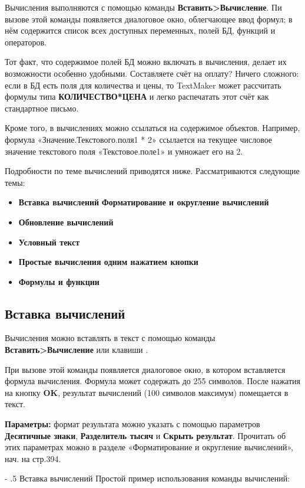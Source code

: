 ﻿\documentclass[a4paper,10pt]{article}
\makeatletter
\renewcommand\paragraph{%
   \@startsection{paragraph}{4}{0mm}%
      {-\baselineskip}%
      {.5\baselineskip}%
      {\normalfont\normalsize\bfseries}}
\makeatother
\begin{document}
Вычисления выполняются с помощью команды \textbf{Вставить>Вычисление}. Пи вызове этой команды появляется диалоговое окно, облегчающее ввод формул; в нём содержится список всех доступных переменных, полей БД, функций и операторов.

Тот факт, что содержимое полей БД можно включать в вычисления, делает их возможности особенно удобными. Составляете счёт на оплату? Ничего сложного: если в БД есть поля для количества и цены, то TextMaker может рассчитать формулы типа \textbf{КОЛИЧЕСТВО*ЦЕНА} и легко распечатать этот счёт как стандартное письмо.

Кроме того, в вычислениях можно ссылаться на содержимое объектов. Например, формула «Значение.Текстового.поля1 * 2» ссылается на текущее числовое значение текстового поля «Текстовое.поле1» и умножает его на 2.

Подробности по теме вычислений приводятся ниже. Рассматриваются следующие темы:

\begin{itemize}
 \item \textbf{Вставка вычислений}
 \textbf{Форматирование и округление вычислений}
 \item \textbf{Обновление вычислений}
 \item \textbf{Условный текст}
 \item \textbf{Простые вычисления одним нажатием кнопки}
 \item \textbf{Формулы и функции}
\end{itemize}

\subsection{Вставка вычислений}
Вычисления можно вставлять в текст с помощью команды \textbf{Вставить>Вычисление} или клавиши .

При вызове этой команды появляется диалоговое окно, в котором вставляется формула вычисления. Формула может содержать до 255 символов. После нажатия на кнопку \textbf{OK}, результат вычислений (100 символов максимум) помещается в текст.

\textbf{Параметры:} формат результата можно указать с помощью параметров \textbf{Десятичные знаки}, \textbf{Разделитель тысяч} и \textbf{Скрыть результат}. Прочитать об этих параметрах можно в разделе «Форматирование и округление вычислений», нач. на стр.394.

\paragraph{Вставка вычислений}
Простой пример использования команды вычислений:
\end{document}
